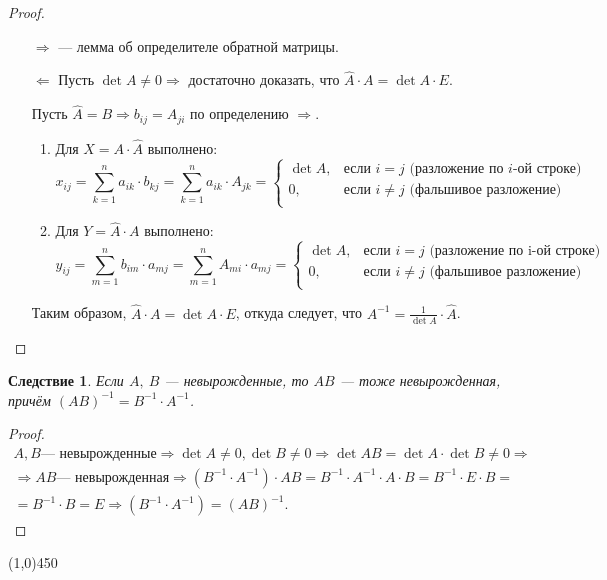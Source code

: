 \documentclass[a4paper,12pt]{article}
\newtheorem*{consequence}{Следствие}
\begin{document}
	\begin{proof}
		\ 
		
		\begin{itemize}
			\item[$\Longrightarrow$] --- лемма об определителе обратной матрицы.
			\item[$\Longleftarrow$] Пусть $\det A \neq 0 \Rightarrow$ достаточно доказать, что $\hat{A} \cdot A = \det A \cdot E$.
			
			Пусть $\hat{A} = B \Rightarrow b_{ij} = A_{ji}$ по определению $\Rightarrow$.
			
			\begin{enumerate}
				\item Для $X = A \cdot \hat{A}$ выполнено:
				$$
				x_{ij} = \sum_{k = 1}^{n} a_{ik} \cdot b_{kj} = \sum_{k = 1}^{n} a_{ik} \cdot A_{jk} = 
				\begin{cases}
				\det A, & \text{если $i = j$ (разложение по $i$-ой строке)}\\
				0, & \text{если $i \neq j$ (фальшивое разложение)}\\
				\end{cases}
				$$
				\item Для $Y = \hat{A} \cdot A$ выполнено:
				$$y_{ij} = \displaystyle\sum_{m = 1}^{n} b_{im} \cdot a_{mj} = \displaystyle\sum_{m = 1}^{n} A_{mi} \cdot a_{mj} = 
				\begin{cases}
				\det A, & \text{если $i = j$ (разложение по i-ой строке)}\\
				0, & \text{если $i \neq j$ (фальшивое разложение)}\\
				\end{cases}
				$$
			\end{enumerate}
			
			Таким образом, $\hat{A} \cdot A = \det A \cdot E$, откуда следует, что $A^{-1} = \displaystyle\frac{1}{\det A} \cdot \hat{A}$.
		\end{itemize}
	\end{proof}
	
	\begin{consequence}
		Если $A,\ B$ --- невырожденные, то $AB$ --- тоже невырожденная,\\ причём $(AB)^{-1} = B^{-1} \cdot A^{-1}$.
	\end{consequence}
	\begin{proof}
		\begin{gather*}
		A, B \text{--- невырожденные} \Rightarrow \det A \neq 0, \det B \neq 0 \Rightarrow \det AB = \det A \cdot \det B \neq 0 \Rightarrow\\\Rightarrow AB \text{--- невырожденная} \Rightarrow (B^{-1} \cdot A^{-1}) \cdot AB = B^{-1} \cdot A^{-1} \cdot A \cdot B = B^{-1} \cdot E \cdot B =\\= B^{-1} \cdot B = E \Rightarrow (B^{-1} \cdot A^{-1}) = (AB)^{-1}.
		\end{gather*}
	\end{proof}
	\begin{center}
		\line(1,0){450}
	\end{center}
\end{document}

